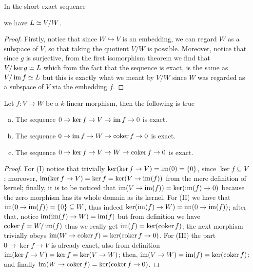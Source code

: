 \begin{proposition}
  In the short exact sequence
  we have \(L \simeq V/W\).
\end{proposition}

\begin{proof}
  Firstly, notice that since \(W \hookrightarrow V\) is an embedding, we can
  regard \(W\) as a subspace of \(V\), so that taking the quotient \(V/W\) is
  possible. Moreover, notice that since \(g\) is surjective, from the first
  isomorphism theorem we find that \(V/\ker g \simeq L\) which from the fact that
  the sequence is exact, is the same as \(V/\operatorname{im} f \simeq L\) but this is exactly
  what we meant by \(V/W\) since \(W\) was regarded as a subspace of \(V\) via
  the embedding \(f\).
\end{proof}

\begin{proposition}
   Let \(f : V \to W\) be a \(k\)-linear morphism, then the following is true
   \begin{enumerate}[(a).]
     \item The sequence \(0 \to \ker f \to V \to \operatorname{im} f \to 0\) is exact.
     \item The sequence \(0 \to \operatorname{im} f \to W \to \operatorname{coker} f \to 0\) is exact.
     \item The sequence \(0 \to \ker f \to V \to W \to \operatorname{coker} f \to 0\) is
       exact.
   \end{enumerate}
\end{proposition}

\begin{proof}
  For (I) notice that trivially \(\ker(\ker f \to V) = \operatorname{im}(0) = \{0\}\), since
  \(\ker f \subseteq V\); moreover, \(\operatorname{im}(\ker f \to V) = \ker f = \ker(V \to
  \operatorname{im}(f))\) from the mere definition of kernel; finally, it is to be noticed
  that \(\operatorname{im}(V \to \operatorname{im}(f)) = \ker(\operatorname{im}(f) \to 0)\) because the zero morphism has
  its whole domain as its kernel.
  For (II) we have that \(\operatorname{im}(0 \to \operatorname{im}(f)) = \{0\} \subseteq W\), thus indeed
  \(\ker(\operatorname{im}(f) \to W) = \operatorname{im}(0 \to \operatorname{im}(f))\); after that, notice \(\operatorname{im}(\operatorname{im}(f)
  \to W) = \operatorname{im}(f)\) but from definition we have \(\operatorname{coker} f = W/\operatorname{im}(f)\) thus we
  really get \(\operatorname{im}(f) = \ker(\operatorname{coker} f)\); the next morphism trivially obeys
  \(\operatorname{im}(W \to \operatorname{coker} f) = \ker(\operatorname{coker} f \to 0)\).
  For (III) the part \(0 \to \ker f \to V\) is already exact, also from
  definition \(\operatorname{im}(\ker f \to V) = \ker f = \ker(V \to W)\); then, \(\operatorname{im}(V \to
  W) = \operatorname{im}(f) = \ker(\operatorname{coker} f)\); and finally  \(\operatorname{im}(W \to \operatorname{coker} f) =
  \ker(\operatorname{coker} f \to 0)\).
\end{proof}

